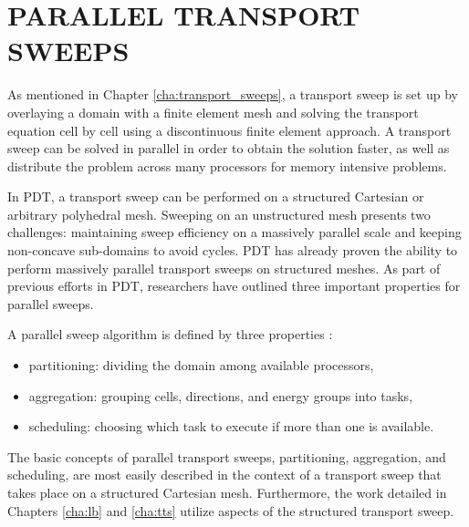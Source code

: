 %
%
%
%



\chapter{PARALLEL TRANSPORT SWEEPS}\label{cha:parallel_transport}
As mentioned in Chapter \ref{cha:transport_sweeps}, a transport sweep is set up by overlaying a domain with a finite element mesh and solving the transport equation cell by cell using a discontinuous finite element approach. A transport sweep can be solved in parallel in order to obtain the solution faster, as well as distribute the problem across many processors for memory intensive problems.

In PDT, a transport sweep can be performed on a structured Cartesian or arbitrary polyhedral mesh. Sweeping on an unstructured mesh presents two challenges: maintaining sweep efficiency on a massively parallel scale and keeping non-concave sub-domains to avoid cycles. PDT has already proven the ability to perform massively parallel transport sweeps on structured meshes. As part of previous efforts in PDT, researchers have outlined three important properties for parallel sweeps.

A parallel sweep algorithm is defined by three properties \cite{mpadams2013} :
\begin{itemize}
\item partitioning: dividing the domain among available processors,
\item aggregation: grouping cells, directions, and energy groups into tasks,
\item scheduling: choosing which task to execute if more than one is available.
\end{itemize}

The basic concepts of parallel transport sweeps, partitioning, aggregation, and scheduling, are most easily described in the context of a  transport sweep that takes place on a structured Cartesian mesh. Furthermore, the work detailed in Chapters \ref{cha:lb} and \ref{cha:tts} utilize aspects of the structured transport sweep.

